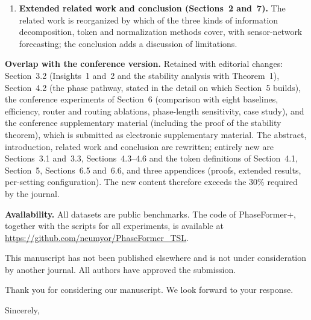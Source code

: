 \documentclass[11pt,a4paper]{letter}
\makeatletter
\renewcommand\closing[1]{\par\nobreak\vspace{\parskip}%
  \stopbreaks
  \noindent
  \parbox{\indentedwidth}{\raggedright
       \ignorespaces #1\\[2\medskipamount]%
       \ifx\@empty\fromsig
           \fromname
       \else \fromsig \fi\strut}%
   \par}
\makeatother
\begin{document}
\begin{letter}
\begin{enumerate}[leftmargin=1.4em,itemsep=0.2em,topsep=0.2em]
\item \textbf{Extended related work and conclusion (Sections~2 and~7).} The related work is reorganized by which of the three kinds of information decomposition, token and normalization methods cover, with sensor-network forecasting; the conclusion adds a discussion of limitations.
\end{enumerate}

\textbf{Overlap with the conference version.} Retained with editorial changes: Section~3.2 (Insights~1 and~2 and the stability analysis with Theorem~1), Section~4.2 (the phase pathway, stated in the detail on which Section~5 builds), the conference experiments of Section~6 (comparison with eight baselines, efficiency, router and routing ablations, phase-length sensitivity, case study), and the conference supplementary material (including the proof of the stability theorem), which is submitted as electronic supplementary material. The abstract, introduction, related work and conclusion are rewritten; entirely new are Sections~3.1 and~3.3, Sections~4.3--4.6 and the token definitions of Section~4.1, Section~5, Sections~6.5 and~6.6, and three appendices (proofs, extended results, per-setting configuration). The new content therefore exceeds the 30\% required by the journal.

\textbf{Availability.} All datasets are public benchmarks. The code of PhaseFormer+, together with the scripts for all experiments, is available at \url{https://github.com/neumyor/PhaseFormer_TSL}.

This manuscript has not been published elsewhere and is not under consideration by another journal. All authors have approved the submission.

Thank you for considering our manuscript. We look forward to your response.

\closing{Sincerely,}

\end{letter}
\end{document}
